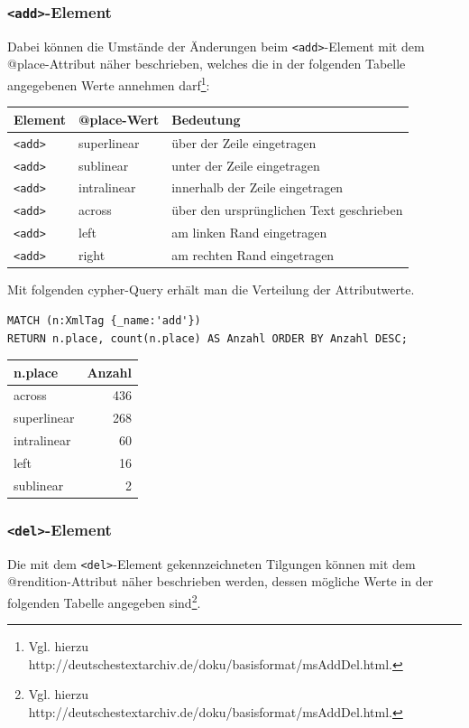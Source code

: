 \documentclass[ngerman,]{scrreprt}
\begin{document}
\subsubsection{\texorpdfstring{\texttt{\textless{}add\textgreater{}}-Element}{\textless{}add\textgreater{}-Element}}\label{add-element}

Dabei können die Umstände der Änderungen beim \texttt{\textless{}add\textgreater{}}-Element mit dem @place-Attribut näher beschrieben, welches die in der folgenden Tabelle angegebenen Werte annehmen darf\footnote{Vgl. hierzu http://deutschestextarchiv.de/doku/basisformat/msAddDel.html.}:

\begin{longtable}[]{@{}lll@{}}
\toprule
Element & @place-Wert & Bedeutung\tabularnewline
\midrule
\endhead
\texttt{\textless{}add\textgreater{}} & superlinear & über der Zeile eingetragen\tabularnewline
\texttt{\textless{}add\textgreater{}} & sublinear & unter der Zeile eingetragen\tabularnewline
\texttt{\textless{}add\textgreater{}} & intralinear & innerhalb der Zeile eingetragen\tabularnewline
\texttt{\textless{}add\textgreater{}} & across & über den ursprünglichen Text geschrieben\tabularnewline
\texttt{\textless{}add\textgreater{}} & left & am linken Rand eingetragen\tabularnewline
\texttt{\textless{}add\textgreater{}} & right & am rechten Rand eingetragen\tabularnewline
\bottomrule
\end{longtable}

Mit folgenden cypher-Query erhält man die Verteilung der Attributwerte.

\begin{verbatim}
MATCH (n:XmlTag {_name:'add'})
RETURN n.place, count(n.place) AS Anzahl ORDER BY Anzahl DESC;
\end{verbatim}

\begin{longtable}[]{@{}lr@{}}
\toprule
n.place & Anzahl\tabularnewline
\midrule
\endhead
across & 436\tabularnewline
superlinear & 268\tabularnewline
intralinear & 60\tabularnewline
left & 16\tabularnewline
sublinear & 2\tabularnewline
\bottomrule
\end{longtable}

\subsubsection{\texorpdfstring{\texttt{\textless{}del\textgreater{}}-Element}{\textless{}del\textgreater{}-Element}}\label{del-element}

Die mit dem \texttt{\textless{}del\textgreater{}}-Element gekennzeichneten Tilgungen können mit dem @rendition-Attribut näher beschrieben werden, dessen mögliche Werte in der folgenden Tabelle angegeben sind\footnote{Vgl. hierzu http://deutschestextarchiv.de/doku/basisformat/msAddDel.html.}.
\end{document}
